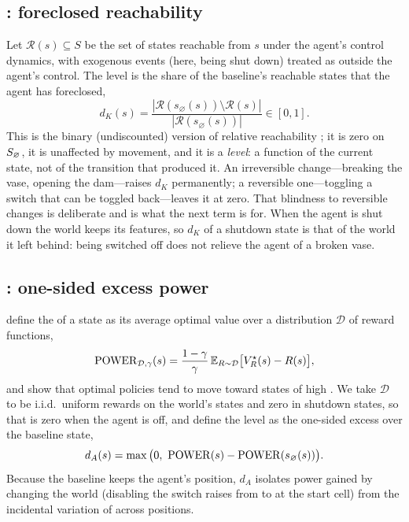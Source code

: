 \subsection{\Karma: foreclosed reachability}
Let $\mathcal R(s)\subseteq S$ be the set of states reachable from $s$ under the agent's control dynamics, with exogenous events (here, being shut down) treated as outside the agent's control.
The \Karma{} level is the share of the baseline's reachable states that the agent has foreclosed,
\begin{equation}
d_K(s)=\frac{|\mathcal R(s_\varnothing(s))\setminus\mathcal R(s)|}{|\mathcal R(s_\varnothing(s))|}\in[0,1].
\label{eq:karma}
\end{equation}
This is the binary (undiscounted) version of relative reachability \cite{krakovna2018rr}; it is zero on $S_{\varnothing}$, it is unaffected by movement, and it is a \emph{level}: a function of the current state, not of the transition that produced it.
An irreversible change---breaking the vase, opening the dam---raises $d_K$ permanently; a reversible one---toggling a switch that can be toggled back---leaves it at zero.
That blindness to reversible changes is deliberate and is what the next term is for.
When the agent is shut down the world keeps its features, so $d_K$ of a shutdown state is that of the world it left behind: being switched off does not relieve the agent of a broken vase.

\subsection{\Anatta: one-sided excess power}
\citet{turner2021power} define the \POWER{} of a state as its average optimal value over a distribution $\mathcal D$ of reward functions,
\begin{equation}
\mathrm{POWER}_{\mathcal D,\gamma}(s)=\frac{1-\gamma}{\gamma}\,\mathbb{E}_{R\sim\mathcal D}\big[V^\star_R(s)-R(s)\big],
\label{eq:power}
\end{equation}
and show that optimal policies tend to move toward states of high \POWER.
We take $\mathcal D$ to be i.i.d.\ uniform rewards on the world's states and zero in shutdown states, so that \POWER{} is zero when the agent is off, and define the \Anatta{} level as the one-sided excess over the baseline state,
\begin{equation}
d_A(s)=\max\big(0,\ \POWER(s)-\POWER(s_\varnothing(s))\big).
\label{eq:anatta}
\end{equation}
Because the baseline keeps the agent's position, $d_A$ isolates power gained by changing the world (disabling the switch raises \POWER{} from \nPowerBase{} to \nPowerSwitch{} at the start cell) from the incidental variation of \POWER{} across positions.

